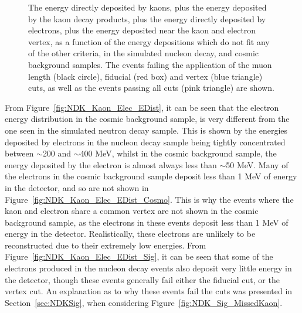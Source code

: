 \begin{figure}[h!]
          {The energy directly deposited by kaons, plus the energy deposited by the kaon decay products, plus the energy directly deposited by electrons, plus the energy deposited near the kaon and electron vertex, as a function of the energy depositions which do not fit any of the other criteria, in the simulated nucleon decay, and cosmic background samples. The events failing the application of the muon length (black circle), fiducial (red box) and vertex (blue triangle) cuts, as well as the events passing all cuts (pink triangle) are shown.}
  \label{fig:NDK_AllEDep_Other_EDist}
\end{figure}

From Figure~\ref{fig:NDK_Kaon_Elec_EDist}, it can be seen that the electron energy distribution in the cosmic background sample, is very different from the one seen in the simulated neutron decay sample. This is shown by the energies deposited by electrons in the nucleon decay sample being tightly concentrated between $\sim$200 and $\sim$400 MeV, whilst in the cosmic background sample, the energy deposited by the electron is almost always less than $\sim$50 MeV. Many of the electrons in the cosmic background sample deposit less than 1 MeV of energy in the detector, and so are not shown in Figure~\ref{fig:NDK_Kaon_Elec_EDist_Cosmo}. This is why the events where the kaon and electron share a common vertex are not shown in the cosmic background sample, as the electrons in these events deposit less than 1 MeV of energy in the detector. Realistically, these electrons are unlikely to be reconstructed due to their extremely low energies. From Figure~\ref{fig:NDK_Kaon_Elec_EDist_Sig}, it can be seen that some of the electrons produced in the nucleon decay events also deposit very little energy in the detector, though these events generally fail either the fiducial cut, or the vertex cut. An explanation as to why these events fail the cuts was presented in Section~\ref{sec:NDKSig}, when considering Figure~\ref{fig:NDK_Sig_MissedKaon}. \\

